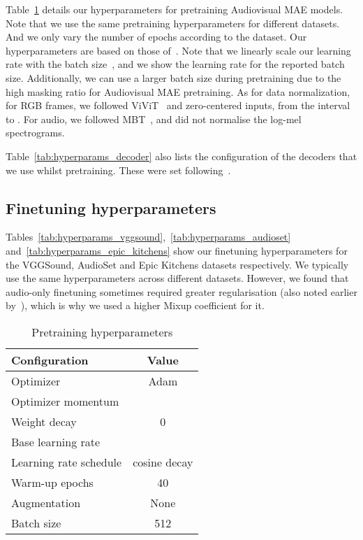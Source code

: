 \documentclass[10pt,twocolumn,letterpaper]{article}
\begin{document}
Table~\ref{tab:hyperparams_pretraining} details our hyperparameters for pretraining Audiovisual MAE models.
Note that we use the same pretraining hyperparameters for different datasets.
And we only vary the number of epochs according to the dataset.
Our hyperparameters are based on those of~\cite{he2022masked, tong2022videomae, feichtenhofer2022masked}.
Note that we linearly scale our learning rate with the batch size~\cite{goyal2017accurate}, and we show the learning rate for the reported batch size.
Additionally, we can use a larger batch size during pretraining due to the high masking ratio for Audiovisual MAE pretraining.
As for data normalization, for RGB frames, we followed ViViT~\cite{arnab2021vivit} and zero-centered inputs, from the interval  to .
For audio, we followed MBT~\cite{nagrani2021attention}, and did not normalise the log-mel spectrograms.

Table~\ref{tab:hyperparams_decoder} also lists the configuration of the decoders that we use whilst pretraining. 
These were set following~\cite{he2022masked,feichtenhofer2022masked,tong2022videomae}.


\subsection{Finetuning hyperparameters}

Tables~\ref{tab:hyperparams_vggsound},~\ref{tab:hyperparams_audioset} and~\ref{tab:hyperparams_epic_kitchens} show our finetuning hyperparameters for the VGGSound, AudioSet and Epic Kitchens datasets respectively.
We typically use the same hyperparameters across different datasets.
However,  we found that audio-only finetuning sometimes required greater regularisation (also noted earlier by~\cite{wang2020makes}), which is why we used a higher Mixup coefficient for it. 

\begin{table}[t] 
	\caption{Pretraining hyperparameters}
	\vspace{-0.6\baselineskip}
	\centering
		\begin{tabular}{lc}
			\toprule 
			Configuration          & Value \\
			\midrule 
			Optimizer              &    Adam    \\
			Optimizer momentum     &    \\ 
			Weight decay           & 0 \\
			Base learning rate     &  \\ Learning rate schedule & cosine decay   \\ 
			Warm-up epochs         &  40  \\ 
			Augmentation           & None  \\
			Batch size             & 512    \\ 
		 
			\bottomrule 
		\end{tabular} 
		\label{tab:hyperparams_pretraining}
\end{table}
\end{document}
